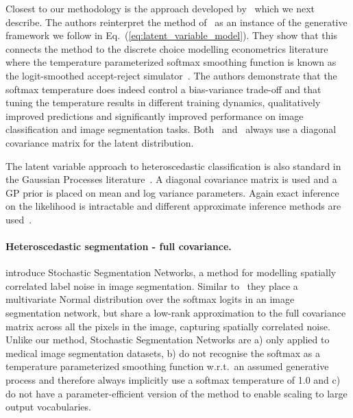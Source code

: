 \documentclass[final]{cvpr}
\begin{document}
Closest to our methodology is the approach developed by~\citet{collier2020analysis} which we next describe. The authors reinterpret the method of~\citet{kendall2017uncertainties} as an instance of the generative framework we follow in Eq.\ (\ref{eq:latent_variable_model}). They show that this connects the method to the discrete choice modelling econometrics literature where the temperature parameterized softmax smoothing function is known as the logit-smoothed accept-reject simulator~\cite{train2009discrete,mcfadden1989method,bolduc1996multinomial}. The authors demonstrate that the softmax temperature does indeed control a bias-variance trade-off and that tuning the temperature results in different training dynamics, qualitatively improved predictions and significantly improved performance on image classification and image segmentation tasks. Both~\citet{kendall2017uncertainties} and~\citet{collier2020analysis} always use a diagonal covariance matrix for the latent distribution.

The latent variable approach to heteroscedastic classification is also standard in the Gaussian Processes literature~\cite{hernandez2014mind,williams2006gaussian}. A diagonal covariance matrix is used and a GP prior is placed on mean and log variance parameters. Again exact inference on the likelihood is intractable and different approximate inference methods are used~\cite{hernandez2014mind}.

\paragraph{Heteroscedastic segmentation - full covariance.}
\citet{monteiro2020stochastic} introduce Stochastic Segmentation Networks, a method for modelling spatially correlated label noise in image segmentation. Similar to~\citet{kendall2017uncertainties} they place a multivariate Normal distribution over the softmax logits in an image segmentation network, but share a low-rank approximation to the full covariance matrix across all the pixels in the image, capturing spatially correlated noise. Unlike our method, Stochastic Segmentation Networks are a) only applied to medical image segmentation datasets, b) do not recognise the softmax as a temperature parameterized smoothing function w.r.t.\ an assumed generative process and therefore always implicitly use a softmax temperature of 1.0 and c) do not have a parameter-efficient version of the method to enable scaling to large output vocabularies.
\end{document}
